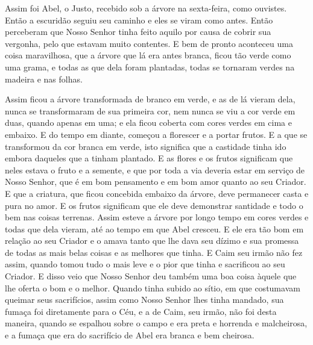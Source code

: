 Assim foi Abel, o Justo, recebido sob a árvore na sexta-feira, como ouvistes.
Então a escuridão seguiu seu caminho e eles se viram como antes. Então
perceberam que Nosso Senhor tinha feito aquilo por causa de cobrir sua
vergonha, pelo que estavam muito contentes. E bem de pronto aconteceu uma coisa
maravilhosa, que a árvore que lá era antes branca, ficou tão verde como uma
grama, e todas as que dela foram plantadas, todas se tornaram verdes na madeira
e nas folhas.

 Assim ficou a árvore transformada de branco em verde, e as de lá vieram dela,
nunca se transformaram de sua primeira cor, nem nunca se viu a cor verde em
duas, quando apenas em uma; e ela ficou coberta com cores verdes em cima e
embaixo. E do tempo em diante, começou a florescer e a portar frutos. E a que
se transformou da cor branca em verde, isto significa que a castidade tinha ido
embora daqueles que a tinham plantado. E as flores e os frutos significam que
neles estava o fruto e a semente, e que por toda a via deveria estar em serviço
de Nosso Senhor, que é em bom pensamento e em bom amor quanto ao seu Criador. E
que a criatura, que ficou concebida embaixo da árvore, deve permanecer casta e
pura no amor. E os frutos significam que ele deve demonstrar santidade e todo o
bem nas coisas terrenas. Assim esteve a árvore por longo tempo em
cores verdes e todas que dela vieram, até ao tempo em que Abel cresceu. E ele
era tão bom em relação ao seu Criador e o amava tanto que lhe dava seu dízimo e
sua promessa de todas as mais belas coisas e as melhores que tinha. E Caim seu
irmão não fez assim, quando tomou tudo o mais leve e o pior que tinha e
sacrificou ao seu Criador. E disso veio que Nosso Senhor deu também uma boa
coisa àquele que lhe oferta o bom e o melhor. Quando tinha subido ao sítio, em
que costumavam queimar seus sacrifícios, assim como Nosso Senhor lhes tinha
mandado, sua fumaça foi diretamente para o Céu, e a de Caim, seu irmão, não foi
desta maneira, quando se espalhou sobre o campo e era preta e horrenda e malcheirosa,
e a fumaça que era do sacrifício de Abel era branca e bem cheirosa.

